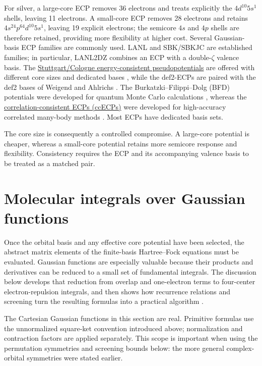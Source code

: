 For silver, a large-core ECP removes 36 electrons and treats explicitly the
$4d^{10}5s^1$ shells, leaving 11 electrons. A small-core ECP removes 28
electrons and retains $4s^24p^64d^{10}5s^1$, leaving 19 explicit electrons;
the semicore $4s$ and $4p$ shells are therefore retained, providing more
flexibility at higher cost. Several Gaussian-basis ECP families are commonly
used. LANL \citep{WadtHay1985} and SBK/SBKJC \citep{Stevens1992} are established families; in particular, LANL2DZ
combines an ECP with a double-$\zeta$ valence basis. The
\href{https://www.tc.uni-koeln.de/PP/clickpse.en.html}
{Stuttgart/Cologne energy-consistent pseudopotentials} are offered with
different core sizes and dedicated bases \citep{Bergner1993}, while the def2-ECPs are paired with
the def2 bases of Weigend and Ahlrichs \citep{WeigendAhlrichs2005}. The Burkatzki--Filippi--Dolg (BFD)
potentials were developed for quantum Monte Carlo calculations \citep{Burkatzki2007}, whereas the
\href{https://pseudopotentiallibrary.org}{correlation-consistent ECPs
(ccECPs)} were developed for high-accuracy correlated many-body methods \citep{Bennett2017}.
Most ECPs have dedicated basis sets.

The core size is consequently a controlled compromise. A large-core potential
is cheaper, whereas a small-core potential retains more semicore response and
flexibility. Consistency requires the ECP and its accompanying valence basis
to be treated as a matched pair.

\section{Molecular integrals over Gaussian functions}
\label{sec:gaussian-integrals}

Once the orbital basis and any effective core potential have been selected,
the abstract matrix elements of the finite-basis Hartree--Fock equations must
be evaluated. Gaussian functions are especially valuable because their
products and derivatives can be reduced to a small set of fundamental
integrals. The discussion below develops that reduction from overlap and
one-electron terms to four-center electron-repulsion integrals, and then shows
how recurrence relations and screening turn the resulting formulas into a
practical algorithm \citep{Gill1994}.

The Cartesian Gaussian functions in this section are real. Primitive
formulas use the unnormalized square-ket convention introduced above;
normalization and contraction factors are applied separately. This scope is
important when using the permutation symmetries and screening bounds below:
the more general complex-orbital symmetries were stated earlier.

